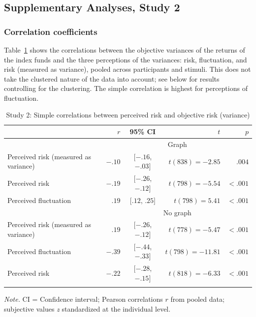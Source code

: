 \subsection{Supplementary Analyses, Study 2}
\label{sup:study2_results}
\subsubsection{Correlation coefficients}
\label{study2_subj_obj_cor}
Table~\ref{tab:study2_subj_obj_cor} shows the correlations between the objective variances of the returns of the index funds and the three perceptions of the variances: risk, fluctuation, and risk (measured as variance), pooled across participants and stimuli. This does not take the clustered nature of the data into account; see below for results controlling for the clustering. The simple correlation is highest for perceptions of fluctuation.
%
\begin{table}[H]
\begin{center}
\begin{threeparttable}
\caption{Study 2: Simple correlations between perceived risk and objective risk (variance)}
\label{tab:study2_subj_obj_cor}
\begin{tabular}{lrcrr}
\toprule
  & $r$ & 95\% CI & $t$ & $p$\\
 \midrule
& \multicolumn{4}{c}{Graph}\\
\cmidrule{2-5}
 Perceived risk (measured as variance) & $-.10$ & $[-.16$, $-.03]$ & $t(838) = -2.85$ & $.004$\\
 Perceived risk & $-.19$& $[-.26$, $-.12]$ & $t(798) = -5.54$& $<.001$\\
 Perceived fluctuation & $.19$ & $[.12$, $.25]$ & $t(798) = 5.41$& $<.001$\\
\midrule
 & \multicolumn{4}{c}{No graph}\\
 \cmidrule{2-5}
 Perceived risk (measured as variance) & $.19$ & $[-.26$, $-.12]$ & $t(778) = -5.47$& $ <.001$\\
 Perceived fluctuation & $-.39$ & $[-.44$, $-.33]$ & $t(798) = -11.81$& $ <.001$\\
 Perceived risk & $-.22$ & $[-.28$, $-.15]$ & $t(818) = -6.33$&  $ <.001$\\
\bottomrule
\addlinespace
\end{tabular}
\begin{tablenotes}[para]
\normalsize{\textit{Note.} CI = Confidence interval; Pearson correlations $r$ from pooled data; subjective values \textit{z} standardized at the individual level.}
\end{tablenotes}
\end{threeparttable}
\end{center}
\end{table}


